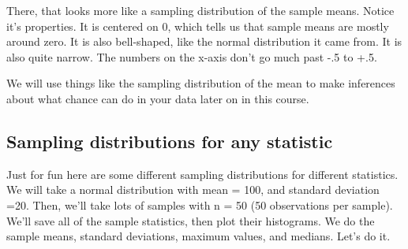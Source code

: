 \documentclass[]{book}
\begin{document}
There, that looks more like a sampling distribution of the sample means.
Notice it's properties. It is centered on 0, which tells us that sample
means are mostly around zero. It is also bell-shaped, like the normal
distribution it came from. It is also quite narrow. The numbers on the
x-axis don't go much past -.5 to +.5.

We will use things like the sampling distribution of the mean to make
inferences about what chance can do in your data later on in this
course.

\subsection{Sampling distributions for any
statistic}\label{sampling-distributions-for-any-statistic}

Just for fun here are some different sampling distributions for
different statistics. We will take a normal distribution with mean =
100, and standard deviation =20. Then, we'll take lots of samples with n
= 50 (50 observations per sample). We'll save all of the sample
statistics, then plot their histograms. We do the sample means, standard
deviations, maximum values, and medians. Let's do it.
\end{document}
